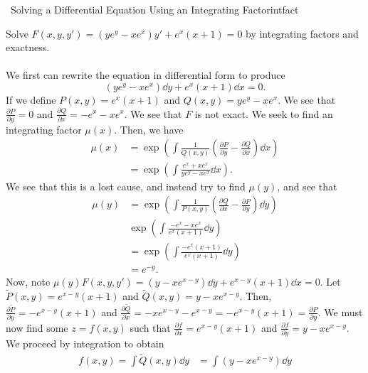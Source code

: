         \begin{example}{\Difficulty\,\Difficulty\,\,Solving a Differential Equation Using an Integrating Factor}{intfact}
            
            Solve \(F(x,y,y')=(ye^y-xe^x)y'+e^x(x+1)=0\) by integrating factors and exactness.
            \\
            \\
            We first can rewrite the equation in differential form to produce
            \begin{equation*}
                (ye^y-xe^x)\dd y+e^x(x+1)\dd x=0.
            \end{equation*}
            If we define \(P(x,y)=e^x(x+1)\) and \(Q(x,y)=ye^y-xe^x\). We see that \(\frac{\partial P}{\partial y}=0\) and \(\frac{\partial Q}{\partial x}=-e^x-xe^x\). We see that \(F\) is not exact. We seek to find an integrating factor \(\mu(x)\). Then, we have
            \begin{align*}
                \mu(x)&=\exp\left(\int \frac{1}{Q(x,y)} \left(\frac{\partial P}{\partial y}-\frac{\partial Q}{\partial x}\right)\dd x\right) \\
                &=\exp\left(\int \frac{e^x+xe^x}{ye^y-xe^x}\dd x\right).
            \end{align*}
            We see that this is a lost cause, and instead try to find \(\mu(y)\), and see that
            \begin{align*}
                \mu(y)&=\exp\left(\int \frac{1}{P(x,y)} \left(\frac{\partial Q}{\partial x}-\frac{\partial P}{\partial y}\right)\dd y\right) \\
                &\exp\left(\int \frac{-e^x-xe^x}{e^x(x+1)}\dd y\right) \\
                &=\exp\left(\int \frac{-e^x(x+1)}{e^x(x+1)}\dd y\right) \\
                &=e^{-y}.
            \end{align*}
            Now, note \(\mu(y)F(x,y,y')=(y-xe^{x-y})\dd y+e^{x-y}(x+1)\dd x=0\). Let \(\tilde{P}(x,y)=e^{x-y}(x+1)\) and \(\tilde{Q}(x,y)=y-xe^{x-y}\). Then, \(\frac{\partial \tilde{P}}{\partial y}=-e^{x-y}(x+1)\) and \(\frac{\partial \tilde{Q}}{\partial x}=-xe^{x-y}-e^{x-y}=-e^{x-y}(x+1)=\frac{\partial P}{\partial y}\). We must now find some \(z=f(x,y)\) such that \(\frac{\partial f}{\partial x}=e^{x-y}(x+1)\) and \(\frac{\partial f}{\partial y}=y-xe^{x-y}\). We proceed by integration to obtain
            \begin{align*}
                f(x,y)=\int \tilde{Q}(x,y)\dd y&=\int (y-xe^{x-y}) \dd y \\

\end{align*}
\end{example}
